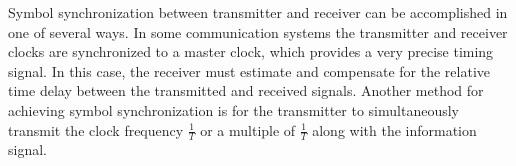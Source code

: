 Symbol synchronization between transmitter and receiver can be accomplished in one of several ways. In some
communication systems the transmitter and receiver clocks are synchronized to a master clock, which
provides a very precise timing signal. In this case, the receiver must estimate and compensate for the
relative time delay between the transmitted and received signals. Another method for achieving \gls{symbol}
synchronization is for the transmitter to simultaneously transmit the clock frequency $\frac{1}{T}$ or a multiple of $\frac{1}{T}$ along with the information signal.\cite{Salehi}

%
% 
 
